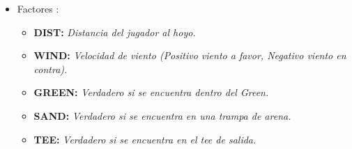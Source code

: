 \documentclass[runningheads,a4paper]{llncs}
\begin{document}
\begin{itemize}
	\item Factores :
	\\
	\begin{itemize}
    \item \textbf{DIST:} \textit{Distancia del jugador al hoyo.}
    \item \textbf{WIND:} \textit{Velocidad de viento (Positivo viento a favor, Negativo viento en contra).}
    \item \textbf{GREEN:} \textit{Verdadero si se encuentra dentro del Green.}
    \item \textbf{SAND:} \textit{Verdadero si se encuentra en una trampa de arena.}
    \item \textbf{TEE:} \textit{Verdadero si se encuentra en el tee de salida.}\\
	\end{itemize}
	

\end{itemize}
\end{document}
